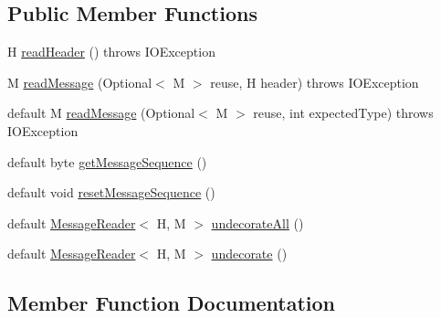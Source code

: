 \subsection*{Public Member Functions}
\begin{DoxyCompactItemize}
\item 
H \mbox{\hyperlink{interfacecom_1_1mysql_1_1cj_1_1protocol_1_1_message_reader_a09745b0e30f74fa13e2b32f22ce70cbb}{read\+Header}} ()  throws I\+O\+Exception
\item 
M \mbox{\hyperlink{interfacecom_1_1mysql_1_1cj_1_1protocol_1_1_message_reader_a39c99a7fe62d037d0f8d96189ba438ba}{read\+Message}} (Optional$<$ M $>$ reuse, H header)  throws I\+O\+Exception
\item 
default M \mbox{\hyperlink{interfacecom_1_1mysql_1_1cj_1_1protocol_1_1_message_reader_aee5bf8361feb7ddf7e420a0d19a0cf61}{read\+Message}} (Optional$<$ M $>$ reuse, int expected\+Type)  throws I\+O\+Exception 
\item 
default byte \mbox{\hyperlink{interfacecom_1_1mysql_1_1cj_1_1protocol_1_1_message_reader_ac4a36fb287c5308dd3d7e6157ef4e237}{get\+Message\+Sequence}} ()
\item 
default void \mbox{\hyperlink{interfacecom_1_1mysql_1_1cj_1_1protocol_1_1_message_reader_a3161e55ab8c1bb4d533aa6d2700fb14d}{reset\+Message\+Sequence}} ()
\item 
default \mbox{\hyperlink{interfacecom_1_1mysql_1_1cj_1_1protocol_1_1_message_reader}{Message\+Reader}}$<$ H, M $>$ \mbox{\hyperlink{interfacecom_1_1mysql_1_1cj_1_1protocol_1_1_message_reader_a22a326215a91e4d7bff08d1f2c3e1b6d}{undecorate\+All}} ()
\item 
default \mbox{\hyperlink{interfacecom_1_1mysql_1_1cj_1_1protocol_1_1_message_reader}{Message\+Reader}}$<$ H, M $>$ \mbox{\hyperlink{interfacecom_1_1mysql_1_1cj_1_1protocol_1_1_message_reader_a59b0e118857c167ad4a270845f19e89b}{undecorate}} ()
\end{DoxyCompactItemize}


\subsection{Member Function Documentation}
\mbox{\label{interfacecom_1_1mysql_1_1cj_1_1protocol_1_1_message_reader_ac4a36fb287c5308dd3d7e6157ef4e237}} 

